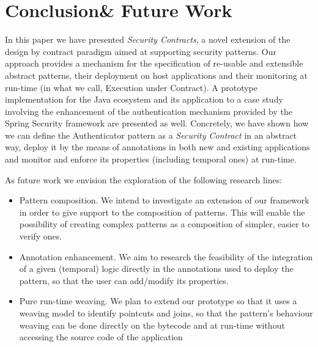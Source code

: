 \section{Conclusion\& Future Work}
\label{sec:conclusion}

In this paper we have presented \emph{Security Contracts}, a novel extension of the design by contract paradigm aimed at supporting security patterns. Our approach provides a mechanism for the specification of re-usable and extensible abstract patterns, their deployment on host applications and their monitoring at run-time (in what we call, Execution under Contract). A prototype implementation for the Java ecosystem and its application to a case study involving the enhancement of the authentication mechanism provided by the Spring Security framework are presented as well. Concretely, we have shown how we can define the Authenticator pattern as a \emph{Security Contract} in an abstract way, deploy it by the means of annotations in both new and existing applications and monitor and enforce its properties (including temporal ones) at run-time.

As future work we envision the exploration of the following research lines:

\begin{itemize}
\item Pattern composition. We intend to investigate an extension of our framework in order to give support to the composition of patterns. This will enable the possibility of creating complex patterns as a composition of simpler, easier to verify ones.
\item Annotation enhancement. We aim to research the feasibility of the integration of a given (temporal) logic directly in the annotations used to deploy the pattern, so that the user can add/modify its properties.
\item Pure run-time weaving. We plan to extend our prototype so that it uses a weaving model to identify pointcuts and joins, so that the pattern's behaviour weaving can be done directly on the bytecode and at run-time without accessing the source code of the application
\end{itemize}
